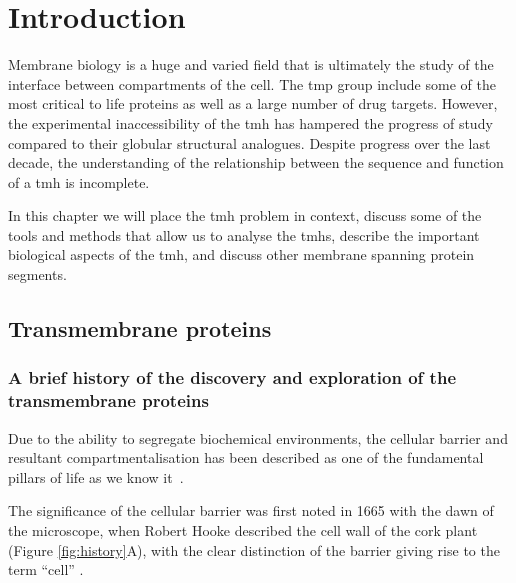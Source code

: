 \chapter{Introduction}
\sloppy
Membrane biology is a huge and varied field that is ultimately the study of the interface between compartments of the cell.
The \gls{tmp} group include some of the most critical to life proteins as well as a large number of drug targets.
However, the experimental inaccessibility of the \gls{tmh} has hampered the progress of study compared to their globular structural analogues.
Despite progress over the last decade, the understanding of the relationship between the sequence and function of a \gls{tmh} is incomplete.

In this chapter we will place the \gls{tmh} problem in context, discuss some of the tools and methods that allow us to analyse the \gls{tmh}s, describe the important biological aspects of the \gls{tmh}, and discuss other membrane spanning protein segments.

\section{Transmembrane proteins}

\subsection{A brief history of the discovery and exploration of the transmembrane proteins}

Due to the ability to segregate biochemical environments, the cellular barrier and resultant compartmentalisation has been described as one of the fundamental pillars of life as we know it~\cite{Ladokhin2015, Koshland2002}.

The significance of the cellular barrier was first noted in 1665 with the dawn of the microscope, when Robert Hooke described the cell wall of the cork plant (Figure \ref{fig:history}A), with the clear distinction of the barrier giving rise to the term ``cell'' \cite{Donaldson2010, hooke1961micrographia}.



